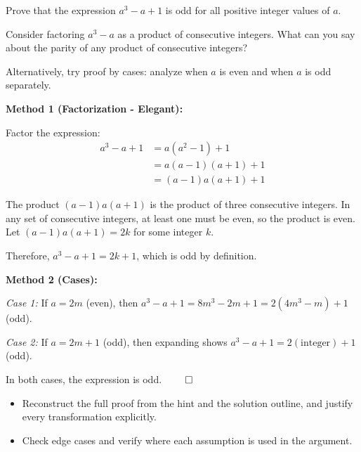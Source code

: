 
\begin{problem}
Prove that the expression $a^3 - a + 1$ is odd for all positive integer values of $a$.
\end{problem}

\begin{hint}
Consider factoring $a^3 - a$ as a product of consecutive integers. What can you say about the parity of any product of consecutive integers?

Alternatively, try proof by cases: analyze when $a$ is even and when $a$ is odd separately.
\end{hint}

\begin{solution}
\textbf{Method 1 (Factorization - Elegant):}

Factor the expression:
\begin{align*}
a^3 - a + 1 &= a(a^2 - 1) + 1 \\
&= a(a-1)(a+1) + 1 \\
&= (a-1)a(a+1) + 1
\end{align*}

The product $(a-1)a(a+1)$ is the product of three consecutive integers. In any set of consecutive integers, at least one must be even, so the product is even. Let $(a-1)a(a+1) = 2k$ for some integer $k$.

Therefore, $a^3 - a + 1 = 2k + 1$, which is odd by definition.

\vspace{0.5cm}

\textbf{Method 2 (Cases):}

\textit{Case 1:} If $a = 2m$ (even), then $a^3 - a + 1 = 8m^3 - 2m + 1 = 2(4m^3 - m) + 1$ (odd).

\textit{Case 2:} If $a = 2m+1$ (odd), then expanding shows $a^3 - a + 1 = 2(\text{integer}) + 1$ (odd).

In both cases, the expression is odd. $\qed$
\end{solution}

\begin{takeaways}
\begin{itemize}[leftmargin=*]
\item Reconstruct the full proof from the hint and the solution outline, and justify every transformation explicitly.
\item Check edge cases and verify where each assumption is used in the argument.
\end{itemize}
\end{takeaways}
